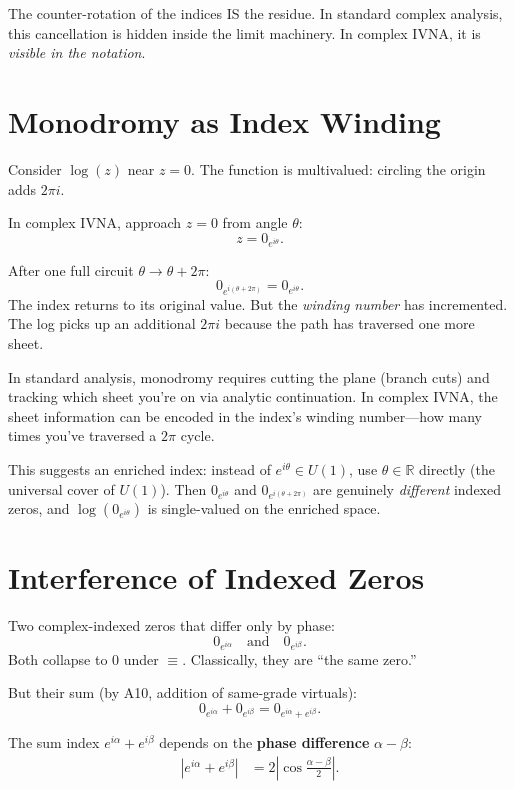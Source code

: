 \documentclass[11pt,a4paper]{article}
\newcommand{\vi}[1]{0_{#1}}          %
\newcommand{\collapse}{\mathrel{\equiv}}
\begin{document}
The counter-rotation of the indices IS the residue. In standard complex analysis, this cancellation is hidden inside the limit machinery. In complex IVNA, it is \emph{visible in the notation}.

\section{Monodromy as Index Winding}

Consider $\log(z)$ near $z = 0$. The function is multivalued: circling the origin adds $2\pi i$.

In complex IVNA, approach $z = 0$ from angle $\theta$:
\[
  z = \vi{e^{i\theta}}.
\]

After one full circuit $\theta \to \theta + 2\pi$:
\[
  \vi{e^{i(\theta + 2\pi)}} = \vi{e^{i\theta}}.
\]
The index returns to its original value. But the \emph{winding number} has incremented. The log picks up an additional $2\pi i$ because the path has traversed one more sheet.

In standard analysis, monodromy requires cutting the plane (branch cuts) and tracking which sheet you're on via analytic continuation. In complex IVNA, the sheet information can be encoded in the index's winding number---how many times you've traversed a $2\pi$ cycle.

This suggests an enriched index: instead of $e^{i\theta} \in U(1)$, use $\theta \in \mathbb{R}$ directly (the universal cover of $U(1)$). Then $\vi{e^{i\theta}}$ and $\vi{e^{i(\theta + 2\pi)}}$ are genuinely \emph{different} indexed zeros, and $\log(\vi{e^{i\theta}})$ is single-valued on the enriched space.

\section{Interference of Indexed Zeros}

Two complex-indexed zeros that differ only by phase:
\[
  \vi{e^{i\alpha}} \quad\text{and}\quad \vi{e^{i\beta}}.
\]
Both collapse to $0$ under $\collapse$. Classically, they are ``the same zero.''

But their sum (by A10, addition of same-grade virtuals):
\[
  \vi{e^{i\alpha}} + \vi{e^{i\beta}} = \vi{e^{i\alpha} + e^{i\beta}}.
\]

The sum index $e^{i\alpha} + e^{i\beta}$ depends on the \textbf{phase difference} $\alpha - \beta$:
\begin{align*}
  \left|e^{i\alpha} + e^{i\beta}\right| &= 2\left|\cos\!\frac{\alpha - \beta}{2}\right|.
\end{align*}
\end{document}
